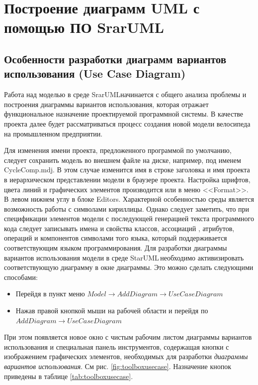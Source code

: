 \documentclass[a4paper,12pt]{report}
\newcommand{\staruml}{StarUML\,\tm}
\begin{document}
\chapter{Построение диаграмм UML с помощью ПО SrarUML\tm}

\section{Особенности разработки диаграмм вариантов использования (Use Case Diagram)}

Работа над моделью в среде SrarUML\tm начинается с общего
анализа проблемы и построения диаграммы вариантов использования,
которая отражает функциональное назначение проектируемой программной
системы.
В качестве проекта далее будет рассматриваться процесс создания новой модели велосипеда на промышленном предприятии.

Для изменения имени
проекта, предложенного программой по умолчанию, следует сохранить
модель во внешнем файле на диске, например, под именем CycleComp.mdj.
В этом случае изменится имя в строке заголовка и имя проекта в
иерархическом представлении модели в браузере проекта.
Настройка шрифтов, цвета линий и графических элементов
производится или в меню <<Format>>.
В левом нижнем углу в блоке Editors. Характерной особенностью среды является
возможность работы с символами кириллицы. Однако следует заметить,
что при спецификации элементов модели с последующей генерацией
текста программного кода следует записывать имена и свойства
классов, ассоциаций , атрибутов, операций и компонентов символами
того языка, который поддерживается соответствующим языком
программирования.
Для разработки диаграммы вариантов использования модели в среде
\staruml необходимо активизировать соответствующую
диаграмму в окне диаграммы. Это можно сделать следующими способами:
\begin{itemize}
	\item Перейдя в пункт меню $Model \to Add Diagram \to Use Case Diagram$
	
	\item Нажав правой кнопкой мыши на рабочей области и перейдя по $Add Diagram \to Use Case Diagram$
\end{itemize}
При этом появляется новое окно с чистым рабочим листом диаграммы вариантов использования и специальная панель инструментов, содержащая кнопки с изображением графических элементов, необходимых для разработки \textit{диаграммы вариантов использования}. См рис. \ref{fig:toolboxusecase}. Назначение кнопок приведены в таблице \ref{tab:toolboxusecase}.
\end{document}
